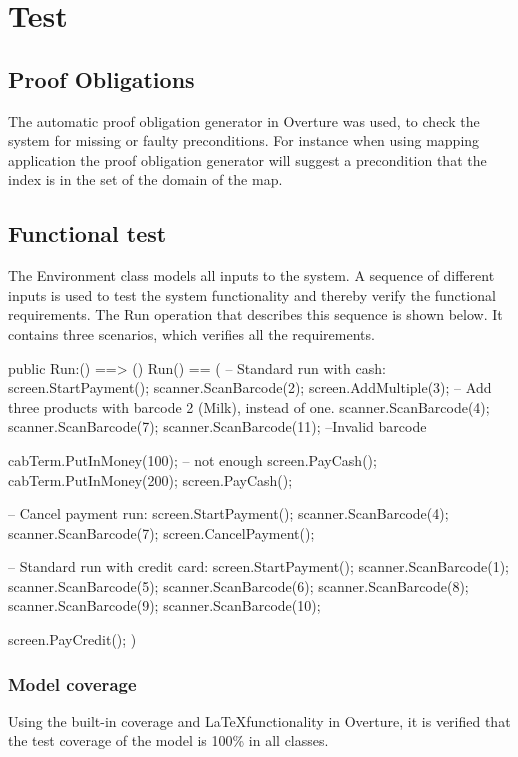 \chapter{Test}\label{chp:Test}

\section{Proof Obligations}
The automatic proof obligation generator in Overture was used, to check the system for missing or faulty preconditions.
For instance when using mapping application the proof obligation generator will suggest a precondition that the index is in the set of the domain of the map.

\section{Functional test}
The Environment class models all inputs to the system. A sequence of different inputs is used to test the system functionality and thereby verify the functional requirements. The Run operation that describes this sequence is shown below. It contains three scenarios, which verifies all the requirements.
\begin{vdmpp}
 public Run:() ==> ()
 Run() ==
 (
 -- Standard run with cash:
  screen.StartPayment();
  scanner.ScanBarcode(2);
  screen.AddMultiple(3); -- Add three products with barcode 2 (Milk), instead of one.
  scanner.ScanBarcode(4);
  scanner.ScanBarcode(7);
  scanner.ScanBarcode(11); --Invalid barcode
  
  cabTerm.PutInMoney(100); -- not enough
  screen.PayCash();
  cabTerm.PutInMoney(200);
  screen.PayCash();
 
 -- Cancel payment run: 
  screen.StartPayment();
  scanner.ScanBarcode(4);
  scanner.ScanBarcode(7);
  screen.CancelPayment(); 
 
 -- Standard run with credit card:
  screen.StartPayment();
  scanner.ScanBarcode(1);
  scanner.ScanBarcode(5);
  scanner.ScanBarcode(6);
  scanner.ScanBarcode(8);
  scanner.ScanBarcode(9);
  scanner.ScanBarcode(10);
  
  screen.PayCredit();
 )
\end{vdmpp}

\subsection{Model coverage}
Using the built-in coverage and \LaTeX \hspace{2pt}functionality in Overture, it is verified that the test coverage of the model is 100\% in all classes.


